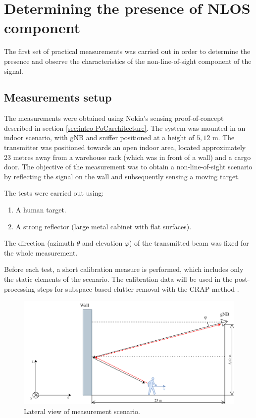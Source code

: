 \chapter{Determining the presence of NLOS component}

The first set of practical measurements was carried out in order to determine the presence and observe the characteristics of the non-line-of-sight component of the signal. 

\section{Measurements setup}
\label{sec:Test1_meas_scenario}

The measurements were obtained using Nokia's sensing proof-of-concept described in section \ref{sec:intro-PoCarchitecture}. The system was mounted in an indoor scenario, with gNB and sniffer positioned at a height of $5,12$ m. The transmitter was positioned towards an open indoor area, located approximately 23 metres away from a warehouse rack (which was in front of a wall) and a cargo door.
The objective of the measurement was to obtain a non-line-of-sight scenario by reflecting the signal on the wall and subsequently sensing a moving target. 

The tests were carried out using:

\begin{enumerate}
	\item A human target.
	\item A strong reflector (large metal cabinet with flat surfaces).
\end{enumerate}

The direction (azimuth $\theta$ and elevation $\varphi$) of the transmitted beam was fixed for the whole measurement.

Before each test, a short calibration measure is performed, which includes only the static elements of the scenario. The calibration data will be used in the post-processing steps for subspace-based clutter removal with the CRAP method  \cite{Henninger_Mandelli_Grudnitsky_Wild_Brink_2023}. 


\begin{figure}[H]
	\centering
	\includegraphics[width=1\textwidth]{Images/Test1/base-lateral_view}
	\caption{Lateral view of measurement scenario.}
	\label{fig:Test1_base-lateral_view}
\end{figure}

